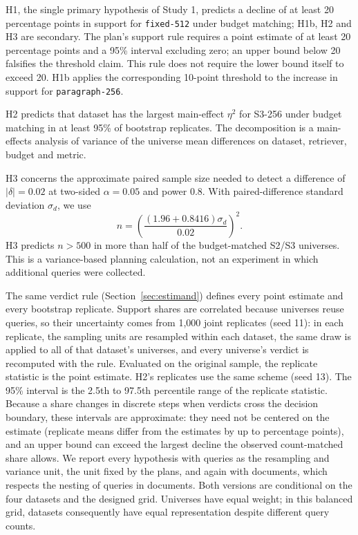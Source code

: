 \documentclass[11pt]{article}
\newcommand{\chunk}[1]{\texttt{#1}}
\begin{document}
H1, the single primary hypothesis of Study 1, predicts a decline of at least 20 percentage points in support for \chunk{fixed-512} under budget matching; H1b, H2 and H3 are secondary. The plan's support rule requires a point estimate of at least 20 percentage points and a 95\% interval excluding zero; an upper bound below 20 falsifies the threshold claim. This rule does not require the lower bound itself to exceed 20. H1b applies the corresponding 10-point threshold to the increase in support for \chunk{paragraph-256}.

H2 predicts that dataset has the largest main-effect $\eta^2$ for S3-256 under budget matching in at least 95\% of bootstrap replicates. The decomposition is a main-effects analysis of variance of the universe mean differences on dataset, retriever, budget and metric.

H3 concerns the approximate paired sample size needed to detect a difference of $|\delta|=0.02$ at two-sided $\alpha=0.05$ and power 0.8. With paired-difference standard deviation $\sigma_d$, we use
\begin{equation}
n=\left(\frac{(1.96+0.8416)\sigma_d}{0.02}\right)^2.
\label{eq:power}
\end{equation}
H3 predicts $n>500$ in more than half of the budget-matched S2/S3 universes. This is a variance-based planning calculation, not an experiment in which additional queries were collected.

The same verdict rule (Section~\ref{sec:estimand}) defines every point estimate and every bootstrap replicate. Support shares are correlated because universes reuse queries, so their uncertainty comes from 1,000 joint replicates (seed 11): in each replicate, the sampling units are resampled within each dataset, the same draw is applied to all of that dataset's universes, and every universe's verdict is recomputed with the rule. Evaluated on the original sample, the replicate statistic is the point estimate. H2's replicates use the same scheme (seed 13). The 95\% interval is the 2.5th to 97.5th percentile range of the replicate statistic. Because a share changes in discrete steps when verdicts cross the decision boundary, these intervals are approximate: they need not be centered on the estimate (replicate means differ from the estimates by up to \ReplicateOffsetMax{} percentage points), and an upper bound can exceed the largest decline the observed count-matched share allows. We report every hypothesis with queries as the resampling and variance unit, the unit fixed by the plans, and again with documents, which respects the nesting of queries in documents. Both versions are conditional on the four datasets and the designed grid. Universes have equal weight; in this balanced grid, datasets consequently have equal representation despite different query counts.
\end{document}
